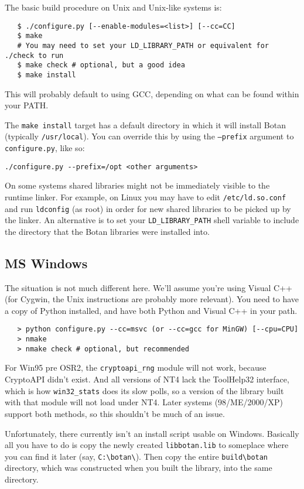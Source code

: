 \documentclass{article}
\newcommand{\filename}[1]{\texttt{#1}}
\begin{document}
The basic build procedure on Unix and Unix-like systems is:

\begin{verbatim}
   $ ./configure.py [--enable-modules=<list>] [--cc=CC]
   $ make
   # You may need to set your LD_LIBRARY_PATH or equivalent for ./check to run
   $ make check # optional, but a good idea
   $ make install
\end{verbatim}

This will probably default to using GCC, depending on what can be
found within your PATH.

The \verb|make install| target has a default directory in which it
will install Botan (typically \verb|/usr/local|). You can override
this by using the \texttt{--prefix} argument to
\filename{configure.py}, like so:

\verb|./configure.py --prefix=/opt <other arguments>|

On some systems shared libraries might not be immediately visible to
the runtime linker. For example, on Linux you may have to edit
\filename{/etc/ld.so.conf} and run \texttt{ldconfig} (as root) in
order for new shared libraries to be picked up by the linker. An
alternative is to set your \texttt{LD\_LIBRARY\_PATH} shell variable
to include the directory that the Botan libraries were installed into.

\subsection{MS Windows}

The situation is not much different here. We'll assume you're using Visual C++
(for Cygwin, the Unix instructions are probably more relevant). You need to
have a copy of Python installed, and have both Python and Visual C++ in your path.

\begin{verbatim}
   > python configure.py --cc=msvc (or --cc=gcc for MinGW) [--cpu=CPU]
   > nmake
   > nmake check # optional, but recommended
\end{verbatim}

For Win95 pre OSR2, the \verb|cryptoapi_rng| module will not work,
because CryptoAPI didn't exist. And all versions of NT4 lack the
ToolHelp32 interface, which is how \verb|win32_stats| does its slow
polls, so a version of the library built with that module will not
load under NT4. Later systems (98/ME/2000/XP) support both methods, so
this shouldn't be much of an issue.

Unfortunately, there currently isn't an install script usable on
Windows. Basically all you have to do is copy the newly created
\filename{libbotan.lib} to someplace where you can find it later (say,
\verb|C:\botan\|). Then copy the entire \verb|build\botan|
directory, which was constructed when you built the library, into the
same directory.
\end{document}
